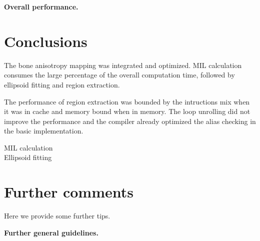 \documentclass[letterpaper]{article}
\newcommand{\mypar}[1]{{\bf #1.}}
\begin{document}
\mypar{Overall performance}

\section{Conclusions}

The bone anisotropy mapping was integrated and optimized. MIL calculation consumes the large percentage of the overall computation time, followed by ellipsoid fitting and region extraction. 

The performance of region extraction was bounded by the intructions mix when it was in cache and memory bound when in memory. The loop unrolling did not improve the performance and the compiler already optimized the alias checking in the basic implementation.

MIL calculation\\

Ellipsoid fitting\\


\section{Further comments}

Here we provide some further tips.

\mypar{Further general guidelines}



\end{document}
